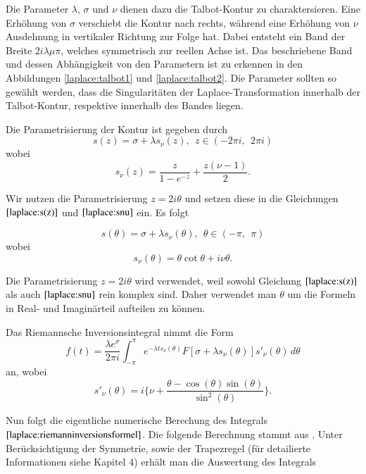 Die Parameter $\lambda$, $\sigma$ und $\nu$ dienen dazu die
Talbot-Kontur zu charaktersieren. Eine Erhöhung von $\sigma$ verschiebt
die Kontur nach rechts, während eine Erhöhung von $\nu$ Ausdehnung
in vertikaler Richtung zur Folge hat. Dabei entsteht ein Band der Breite $2i\lambda\mu\pi$, welches symmetrisch zur reellen Achse ist. Das beschriebene Band und dessen Abhängigkeit von den Parametern ist zu erkennen in den Abbildungen \ref{laplace:talbot1} und \ref{laplace:talbot2}. Die Parameter sollten so gewählt werden, dass die Singularitäten der Laplace-Transformation innerhalb der Talbot-Kontur, respektive innerhalb des Bandes liegen. 


Die Parametrisierung der Kontur ist gegeben durch
\begin{equation}
s(z) = \sigma+\lambda s_{\nu}(z),~~ z\in (-2\pi i,~~2\pi i)
\label{laplace:s(z)}
\end{equation}
wobei
\begin{equation}
s_{\nu}(z)=\frac{z}{1-e^{-z}}+\frac{z(\nu-1)}{2}.
\label{laplace:snu}
\end{equation}

Wir nutzen die Parametrisierung $z=2i\theta$ und setzen diese in die Gleichungen $\eqref{laplace:s(z)}$ und $\eqref{laplace:snu}$ ein. Es folgt

\begin{equation}
s(\theta) = \sigma+\lambda s_{\nu}(\theta),~~ \theta\in (-\pi ,~~\pi)
\end{equation}
wobei
\begin{equation}
s_{\nu}(\theta)=\theta \cot\theta+i\nu\theta.
\end{equation}

Die Parametrisierung $z=2i\theta$ wird verwendet, weil sowohl Gleichung $\eqref{laplace:s(z)}$ als auch $\eqref{laplace:snu}$ rein komplex sind. Daher verwendet man $\theta$ um die Formeln in Real- und Imaginärteil aufteilen zu können.

Das Riemannsche Inversionsintegral nimmt die Form 
\begin{equation}
f(t)=\frac{\lambda e^{\sigma}}{2\pi i}\int_{-\pi}^{\pi} e^{-\lambda ts_{\nu}(\theta)}F[\sigma + \lambda s_{\nu}(\theta)]s'_{\nu}(\theta)\,d\theta
\end{equation}
an, wobei
\begin{equation}
s'_{\nu}(\theta) = i \Biggl\{\nu + \frac{\theta-\cos(\theta)\sin(\theta)}{\sin^{2}(\theta)}  \Biggr\}.
\end{equation}


Nun folgt die eigentliche numerische Berechung des Integrals $\eqref{laplace:riemanninversionsformel}$. Die folgende Berechnung stammt aus \cite{laplace:talbot}. Unter Berücksichtigung der Symmetrie, sowie der Trapezregel (für detailierte Informationen siehe Kapitel 4) erhält man die Auswertung des Integrals

